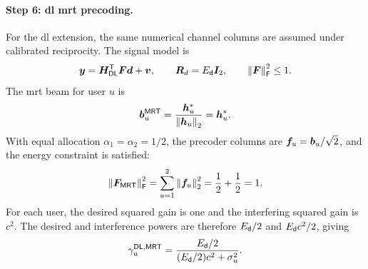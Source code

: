 \paragraph{Step 6: \ac{dl} \ac{mrt} precoding.}
For the \ac{dl} extension, the same numerical channel columns are assumed under calibrated reciprocity. The signal model is
\begin{equation*}
	\bm{y}={\bm{H}}^{\mathsf{T}}_{\mathsf{DL}}\bm{F}\bm{d}+\bm{v},
	\qquad
	\bm{R}_d=E_{\mathsf{d}}\bm{I}_2,
	\qquad
	\left\|\bm{F}\right\|_{\mathsf{F}}^2\leq1.
\end{equation*}
The \ac{mrt} beam for user $u$ is
\begin{equation*}
	\bm{b}_u^{\mathsf{MRT}}
	=\frac{{\bm{h}}^{*}_u}{\left\|\bm{h}_u\right\|_2}
	={\bm{h}}^{*}_u.
\end{equation*}
With equal allocation $\alpha_1=\alpha_2=1/2$, the precoder columns are $\bm{f}_u=\bm{b}_u/\sqrt2$, and the energy constraint is satisfied:
\begin{equation*}
	\left\|\bm{F}_{\mathsf{MRT}}\right\|_{\mathsf{F}}^2
	=\sum_{u=1}^{2}\left\|\bm{f}_u\right\|_2^2
	=\frac12+\frac12=1.
\end{equation*}
For each user, the desired squared gain is one and the interfering squared gain is $c^2$. The desired and interference powers are therefore $E_{\mathsf{d}}/2$ and $E_{\mathsf{d}} c^2/2$, giving
\begin{equation}
	\gamma_u^{\mathsf{DL},\mathsf{MRT}}
	=\frac{E_{\mathsf{d}}/2}{(E_{\mathsf{d}}/2)c^2+\sigma_u^2}.
	\label{eq06:dl-mrt}
\end{equation}

